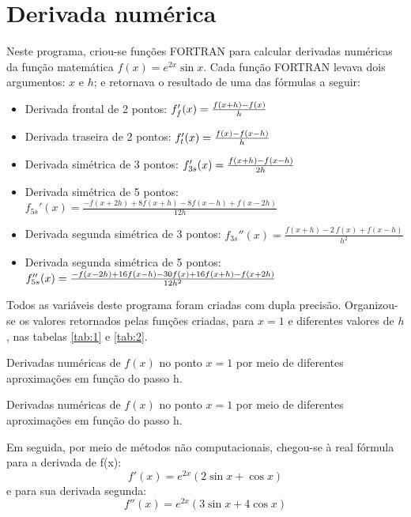 \message{ !name(relatorio.tex)}\documentclass{article}
\begin{document}


\section{Derivada numérica}

Neste programa, criou-se  funções FORTRAN para calcular derivadas numéricas da função matemática $f(x)=e^{2x}\sin{x}$. Cada função FORTRAN levava dois argumentos: $x$ e $h$; e retornava o resultado de uma das fórmulas a seguir:

\begin{itemize}
\item Derivada frontal de 2 pontos: \(f_f'(x)={f(x+h)-f(x) \over h}\)
\item Derivada traseira de 2 pontos: \(f_t'(x)={f(x)-f(x-h) \over h}\)
\item Derivada simétrica de 3 pontos: \(f_{3s}'(x)={f(x+h)-f(x-h) \over 2h}\)
\item Derivada simétrica de 5 pontos: \(f_{5s}'(x)={\frac {-f(x+2h)+8f(x+h)-8f(x-h)+f(x-2h)}{12h}}\)
\item Derivada segunda simétrica de 3 pontos: \(f_{3s}''(x)=\frac{f(x+h)-2\,f(x)+f(x-h)}{h^2}\)
\item Derivada segunda simétrica de 5 pontos: \(f_{5s}''(x) ={ -f (x - 2h) + 16f (x - h) - 30f (x) + 16f (x + h) - f (x + 2h)\over 12h^2}\)
\end{itemize}

Todos as variáveis deste programa foram criadas com dupla precisão.
Organizou-se os valores retornados pelas funções criadas, para $x = 1$ e diferentes valores de $h$, nas tabelas \ref{tab:1} e \ref{tab:2}.

\begin{table}[h]
  \centering
  
  \caption{Derivadas numéricas de $f(x)$ no ponto $x = 1$ por meio de diferentes aproximações em função do passo h.}
  \label{tab:1}
\end{table}

\begin{table}[h]
  \centering
  
  \caption{Derivadas numéricas de $f (x)$ no ponto $x = 1$ por meio de diferentes aproximações em função do passo h.}
  \label{tab:2}
\end{table}

Em seguida, por meio de métodos não computacionais, chegou-se à real fórmula para a derivada de f(x):
\[f'(x)=e^{2x}(2\sin{x}+\cos{x})\]
e para sua derivada segunda:
\[f''(x)=e^{2x}(3\sin{x}+4\cos{x})\]
\end{document}
